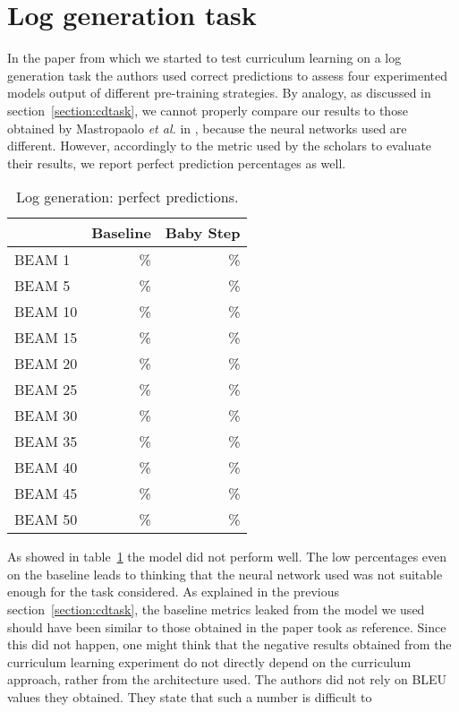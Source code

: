 \section{Log generation task}
In the paper from which we started to test curriculum learning on a log generation task the authors used
correct predictions to assess four experimented models output of different pre-training strategies. 
By analogy, as discussed in section~\ref{section:cdtask}, we cannot properly compare our results to those 
obtained by Mastropaolo \textit{et al.} in \cite{Mastropaolo2022}, because the neural networks used are different.
However, accordingly to the metric used by the scholars to evaluate their results, we report perfect prediction percentages as well.
\begin{table}[h!]
    \centering
    \begin{tabular}{l|r|r} 
    & Baseline & Baby Step\\ [0.5ex] 
    \hline
    BEAM 1 & \% &  \%\\  
    BEAM 5 &  \% &  \% \\ 
    BEAM 10 &  \% &  \%\\
    BEAM 15 &  \% &  \%\\
    BEAM 20 &  \% &  \%\\
    BEAM 25 &  \% &  \%\\
    BEAM 30 &  \% &  \%\\
    BEAM 35 &  \% &  \%\\
    BEAM 40 &  \% &  \%\\
    BEAM 45 &  \%& \%\\
    BEAM 50 &  \%& \%\\ [1ex]
    \end{tabular}
    \caption{Log generation: perfect predictions.}
    \label{table:3}
\end{table}
As showed in table~\ref{table:3} the model did not perform well. The low percentages even on the baseline
leads to thinking that the neural network used was not suitable enough for the task considered. 
As explained in the previous section~\ref{section:cdtask}, the baseline metrics leaked from the model we used
should have been similar to those obtained in the paper took as reference. Since this did not happen,
one might think that the negative results obtained from the curriculum learning experiment do not directly 
depend on the curriculum approach, rather from the architecture used.
The authors did not rely on BLEU values they obtained. They state that such a number is difficult to 
